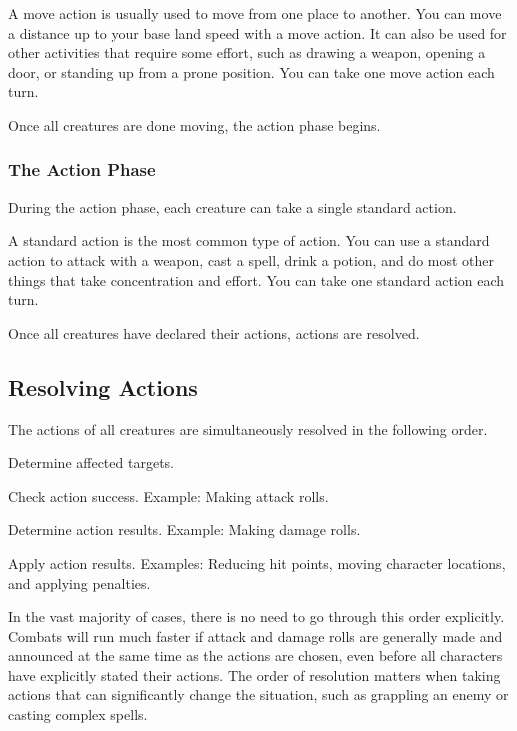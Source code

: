  A move action is usually used to move from one place to another. You can move a distance up to your base land speed with a move action. It can also be used for other activities that require some effort, such as drawing a weapon, opening a door, or standing up from a prone position. You can take one move action each turn.

Once all creatures are done moving, the action phase begins.

\subsubsection{The Action Phase}\label{The Action Phase}

During the action phase, each creature can take a single standard action.

 A standard action is the most common type of action. You can use a standard action to attack with a weapon, cast a spell, drink a potion, and do most other things that take concentration and effort. You can take one standard action each turn.

Once all creatures have declared their actions, actions are resolved.

\subsection{Resolving Actions}\label{Resolving Actions}

The actions of all creatures are simultaneously resolved in the following order.

\begin{enumerate*}
    \item Determine affected targets.
    \item Check action success. Example: Making attack rolls.
    \item Determine action results. Example: Making damage rolls.
    \item Apply action results. Examples: Reducing hit points, moving character locations, and applying penalties.
\end{enumerate*}

In the vast majority of cases, there is no need to go through this order explicitly. Combats will run much faster if attack and damage rolls are generally made and announced at the same time as the actions are chosen, even before all characters have explicitly stated their actions. The order of resolution matters when taking actions that can significantly change the situation, such as grappling an enemy or casting complex spells.

